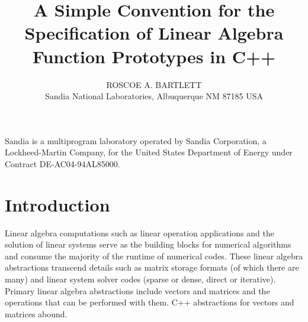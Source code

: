 \documentclass[acmtoms,acmnow]{acmtrans2m}
\title{
A Simple Convention for the Specification of Linear Algebra Function
Prototypes in C++ }
\author{
ROSCOE A. BARTLETT \\
Sandia National Laboratories, Albuquerque NM 87185 USA}
\begin{document}
            
\begin{bottomstuff} 
Sandia is a multiprogram laboratory operated by Sandia Corporation, a
Lockheed-Martin Company, for the United States Department of Energy
under Contract DE-AC04-94AL85000.
\end{bottomstuff}
            
\maketitle

\section{Introduction}

Linear algebra computations such as linear operation applications and
the solution of linear systems serve as the building blocks for
numerical algorithms and consume the majority of the runtime of
numerical codes.  These linear algebra abstractions transcend details
such as matrix storage formats (of which there are many) and linear
system solver codes (sparse or dense, direct or iterative).  Primary
linear algebra abstractions include vectors and matrices and the
operations that can be performed with them.  C++ abstractions for
vectors and matrices abound.
\end{document}
